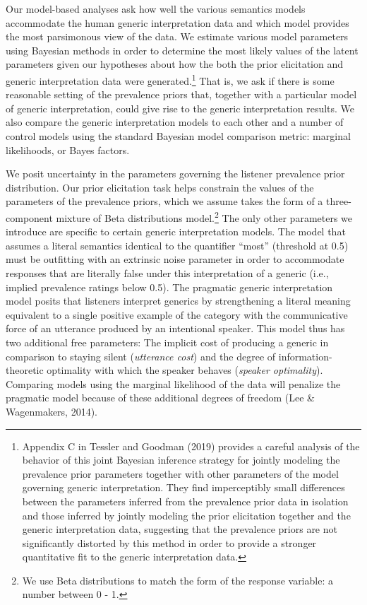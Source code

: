 \documentclass[floatsintext,doc]{apa6}
\let\rmarkdownfootnote\footnote%
\def\footnote{\protect\rmarkdownfootnote}
\begin{document}
Our model-based analyses ask how well the various semantics models accommodate the human generic interpretation data and which model provides the most parsimonous view of the data.
We estimate various model parameters using Bayesian methods in order to determine the most likely values of the latent parameters given our hypotheses about how the both the prior elicitation and generic interpretation data were generated.\footnote{Appendix C in Tessler and Goodman (2019) provides a careful analysis of the behavior of this joint Bayesian inference strategy for jointly modeling the prevalence prior parameters together with other parameters of the model governing generic interpretation. They find imperceptibly small differences between the parameters inferred from the prevalence prior data in isolation and those inferred by jointly modeling the prior elicitation together and the generic interpretation data, suggesting that the prevalence priors are not significantly distorted by this method in order to provide a stronger quantitative fit to the generic interpretation data.}
That is, we ask if there is some reasonable setting of the prevalence priors that, together with a particular model of generic interpretation, could give rise to the generic interpretation results.
We also compare the generic interpretation models to each other and a number of control models using the standard Bayesian model comparison metric: marginal likelihoods, or Bayes factors.

We posit uncertainty in the parameters governing the listener prevalence prior distribution.
Our prior elicitation task helps constrain the values of the parameters of the prevalence priors, which we assume takes the form of a three-component mixture of Beta distributions model.\footnote{We use Beta distributions to match the form of the response variable: a number between 0 - 1.}
The only other parameters we introduce are specific to certain generic interpretation models.
The model that assumes a literal semantics identical to the quantifier \enquote{most} (threshold at 0.5) must be outfitting with an extrinsic noise parameter in order to accommodate responses that are literally false under this interpretation of a generic (i.e., implied prevalence ratings below 0.5).
The pragmatic generic interpretation model posits that listeners interpret generics by strengthening a literal meaning equivalent to a single positive example of the category with the communicative force of an utterance produced by an intentional speaker.
This model thus has two additional free parameters: The implicit cost of producing a generic in comparison to staying silent (\emph{utterance cost}) and the degree of information-theoretic optimality with which the speaker behaves (\emph{speaker optimality}).
Comparing models using the marginal likelihood of the data will penalize the pragmatic model because of these additional degrees of freedom (Lee \& Wagenmakers, 2014).
\end{document}

